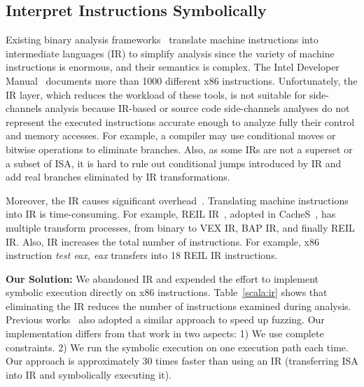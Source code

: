 \subsection{Interpret Instructions Symbolically}
Existing binary analysis frameworks~\cite{shoshitaishvili2016state,
  10.1007/978-3-642-22110-1_37, song2008bitblaze} translate machine instructions into
intermediate languages (IR) to simplify analysis since
the variety of machine instructions is
enormous, and their semantics is complex. The Intel Developer
Manual~\cite{intelsys} documents more than 1000 different x86 instructions.
Unfortunately, the IR layer, which
reduces the workload of these tools, is not suitable for side-channels
analysis because
IR-based or source code side-channels analyses do not represent the executed instructions accurate enough to analyze fully their control and memory accesses.
For example, a compiler may use conditional moves or bitwise operations to eliminate
branches. Also, as some IRs are not a superset or a subset of ISA,
it is hard to rule out conditional jumps introduced by IR and add real branches
eliminated by IR transformations.

Moreover, the IR causes significant overhead~\cite{217563}.
Translating machine instructions into IR is time-consuming. For example,
REIL IR~\cite{dullien2009reil}, adopted in CacheS~\cite{236338}, has multiple
transform processes, from binary to VEX IR, BAP IR, and finally REIL IR\@.
Also, IR increases the total number of instructions. For example, x86
instruction \textit{test eax, eax} transfers into 18 REIL IR instructions.

\textbf{Our Solution:}
We abandoned IR and expended the effort to implement
symbolic execution directly on x86 instructions.
Table~\ref{scala:ir} shows that eliminating the IR reduces the number
of instructions examined during analysis. Previous works~\cite{217563} also
adopted a similar approach to speed up fuzzing. Our implementation differs
from that work in two aspects: 1) We use complete constraints. 2) We run the
symbolic execution on one execution path each time. Our approach is approximately 30 times faster than using an IR (transferring ISA into IR and
symbolically executing it).

